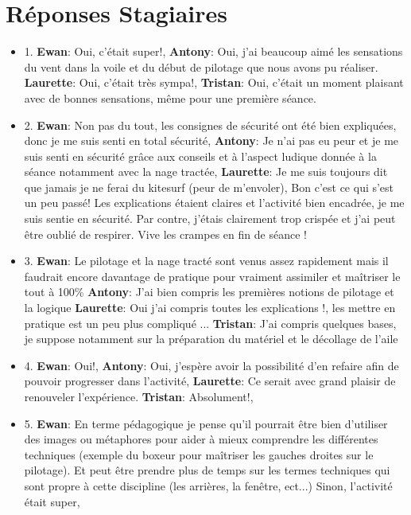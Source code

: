 \documentclass[12pt,a4paper]{report}
\begin{document}
\chapter{Réponses Stagiaires}
\begin{itemize}
\item 1. \textbf{Ewan}: Oui, c'était super!, \textbf{Antony}: Oui, j'ai beaucoup aimé les
sensations du vent  dans la voile et du début de  pilotage que nous avons  pu réaliser.                                      
\textbf{Laurette}: Oui, c'était très sympa!, \textbf{Tristan}: Oui, c'était un moment plaisant avec de
bonnes sensations, m\^eme pour une première séance.
\item 2. \textbf{Ewan}: Non pas du tout, les consignes de sécurité ont été bien expliquées,
donc je me suis senti en total sécurité,  \textbf{Antony}: Je n'ai pas eu peur et je me suis 
senti en sécurité gr\^ace aux conseils et à l'aspect ludique donnée à la séance 
notamment avec la nage tractée, \textbf{Laurette}: Je me suis toujours dit que jamais je ne
ferai du kitesurf (peur de m'envoler), Bon c'est ce qui s'est un peu passé! Les explications étaient 
claires et l'activité bien encadrée, je me suis sentie en sécurité. Par contre, j'étais clairement
trop crispée et j'ai peut \^etre oublié de respirer. Vive les crampes en fin de séance ! 
\item 3. \textbf{Ewan}: Le pilotage et la nage tracté sont venus assez rapidement mais 
il faudrait encore davantage de pratique pour vraiment assimiler et maîtriser le tout à 100\%
\textbf{Antony}: J'ai bien compris les premières notions de pilotage et la logique
\textbf{Laurette}: Oui j'ai compris toutes les explications !, les mettre en pratique est un
peu plus compliqué ...
\textbf{Tristan}: J'ai compris quelques bases, je suppose notamment sur la préparation
du matériel et le décollage de l'aile
\item 4. \textbf{Ewan}: Oui!, \textbf{Antony}: Oui, j'espère avoir la possibilité d'en refaire afin de pouvoir progresser dans l'activité, \textbf{Laurette}: Ce serait avec grand plaisir de renouveler l'expérience.
\textbf{Tristan}: Absolument!, 
\item 5. \textbf{Ewan}: En terme pédagogique je pense qu'il pourrait \^etre bien d'utiliser des images ou métaphores pour aider à mieux comprendre les différentes techniques (exemple du boxeur pour maîtriser les gauches droites sur le  pilotage). Et peut \^etre prendre plus de temps sur les termes techniques qui sont
propre à cette discipline (les arrières, la fen\^etre, ect...) Sinon, l'activité était super,

\end{itemize}
\end{document}
